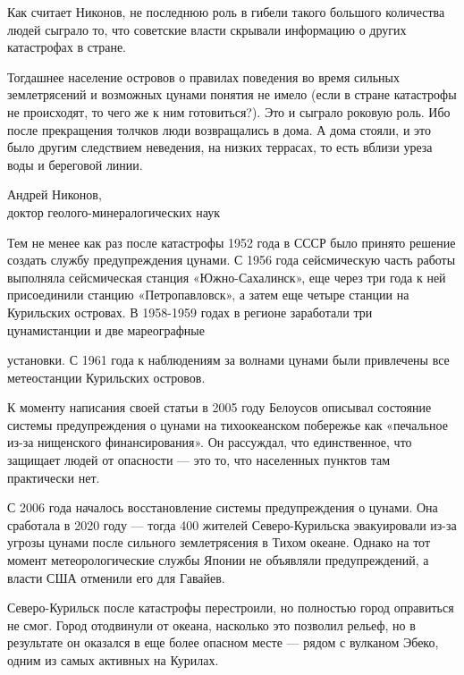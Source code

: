 Как считает Никонов, не последнюю роль в гибели такого большого количества людей сыграло то, что советские власти скрывали информацию о других катастрофах в стране.

\begin{fancyquotes}
    Тогдашнее население островов о правилах поведения во время сильных землетрясений и возможных цунами понятия не имело (если в стране катастрофы не происходят, то чего же к ним готовиться?). Это и сыграло роковую роль. Ибо после прекращения толчков люди возвращались в дома. А дома стояли, и это было другим следствием неведения, на низких террасах, то есть вблизи уреза воды и береговой линии.

    \begin{flushright}
        Андрей Никонов,
        \\
        доктор геолого-минералогических наук
    \end{flushright}
\end{fancyquotes}

Тем не менее как раз после катастрофы 1952 года в СССР было принято решение создать службу предупреждения цунами. С 1956 года сейсмическую часть работы выполняла сейсмическая станция «Южно-Сахалинск», еще через три года к ней присоединили станцию «Петропавловск», а затем еще четыре станции на Курильских островах. В 1958-1959 годах в регионе заработали три цунамистанции и две мареографные

установки. С 1961 года к наблюдениям за волнами цунами были привлечены все метеостанции Курильских островов.

К моменту написания своей статьи в 2005 году Белоусов описывал состояние системы предупреждения о цунами на тихоокеанском побережье как «печальное из-за нищенского финансирования». Он рассуждал, что единственное, что защищает людей от опасности --- это то, что населенных пунктов там практически нет.

С 2006 года началось восстановление системы предупреждения о цунами. Она сработала в 2020 году --- тогда 400 жителей Северо-Курильска эвакуировали из-за угрозы цунами после сильного землетрясения в Тихом океане. Однако на тот момент метеорологические службы Японии не объявляли предупреждений, а власти США отменили его для Гавайев.

Северо-Курильск после катастрофы перестроили, но полностью город оправиться не смог. Город отодвинули от океана, насколько это позволил рельеф, но в результате он оказался в еще более опасном месте --- рядом с вулканом Эбеко, одним из самых активных на Курилах.

